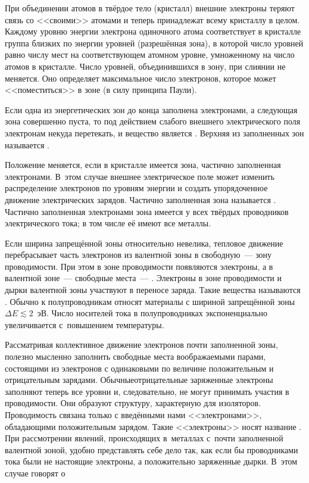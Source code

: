 При объединении атомов в твёрдое тело (кристалл) внешние электроны теряют связь
со <<своими>> атомами и теперь принадлежат всему кристаллу в целом. Каждому
уровню энергии электрона одиночного атома соответствует в кристалле группа
близких по энергии уровней (разрешённая зона), в которой число уровней равно
числу мест на соответствующем атомном уровне, умноженному на число атомов в
кристалле. Число уровней, объединившихся в зону, при слиянии не меняется. Оно
определяет максимальное число электронов, которое может <<поместиться>> в зоне
(в силу принципа Паули).

Если одна из энергетических зон до конца заполнена электронами, а следующая зона
совершенно пуста, то под действием слабого внешнего электрического поля
электронам некуда перетекать, и вещество является .
Верхняя из заполненных зон называется .

Положение меняется, если в кристалле имеется зона, частично заполненная
электронами. В~этом случае внешнее электрическое поле может изменить
распределение электронов по уровням энергии и создать упорядоченное движение
электрических зарядов. Частично заполненная зона называется . Частично заполненная электронами зона имеется у всех твёрдых
проводников электрического тока; в том числе её имеют все металлы.

Если ширина запрещённой зоны относительно невелика, тепловое движение
перебрасывает часть электронов из валентной зоны в свободную~--- зону
проводимости. При этом в зоне проводимости появляются электроны, а в валентной
зоне~--- свободные места~--- . Электроны в зоне проводимости и
дырки валентной зоны участвуют в переносе заряда. Такие вещества называются
. Обычно к полупроводникам относят материалы с
шириной запрещённой зоны $\Delta E \lesssim 2$~эВ. Число носителей тока в
полупроводниках экспоненциально увеличивается с~повышением температуры.

Рассматривая коллективное движение электронов почти заполненной зоны, полезно
мысленно заполнить свободные места
воображаемыми парами, состоящими из электронов с одинаковыми по величине
положительным и отрицательным зарядами. Обычныеотрицательные заряженные
электроны заполняют теперь все уровни и, следовательно, не могут принимать
участия в проводимости. Они образуют структуру, характерную для изоляторов.
Проводимость связана только с введёнными нами
<<электронами>>, обладающими положительным зарядом. Такие <<электроны>> носят
название . При рассмотрении явлений, происходящих в~металлах
с~почти заполненной валентной зоной, удобно представлять себе дело так, как если
бы проводниками тока были не настоящие электроны, а положительно заряженные
дырки. В~этом случае говорят о 

